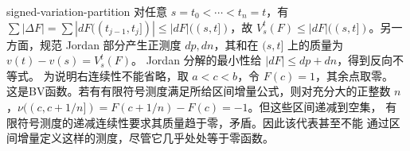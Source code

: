 \begin{solution}{signed-variation-partition}
对任意 \(s=t_0<\cdots<t_n=t\)，有
\(\sum|\Delta F|=\sum|dF((t_{j-1},t_j])|\le|dF|((s,t])\)，故
\(V_s^t(F)\le|dF|((s,t])\)。另一方面，规范 Jordan 部分产生正测度
\(dp,dn\)，其和在 \((s,t]\) 上的质量为 \(v(t)-v(s)=V_s^t(F)\)。
Jordan 分解的最小性给 \(|dF|\le dp+dn\)，得到反向不等式。
为说明右连续性不能省略，取 \(a<c<b\)，令 \(F(c)=1\)，其余点取零。
这是BV函数。若有有限符号测度满足所给区间增量公式，则对充分大的正整数
\(n\)，\(\nu((c,c+1/n])=F(c+1/n)-F(c)=-1\)。但这些区间递减到空集，
有限符号测度的递减连续性要求其质量趋于零，矛盾。因此该代表甚至不能
通过区间增量定义这样的测度，尽管它几乎处处等于零函数。
\end{solution}
